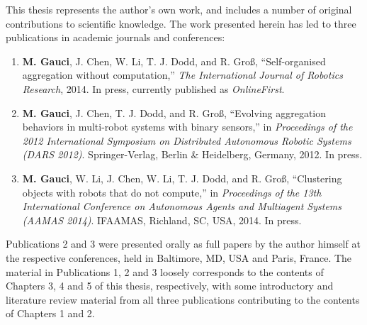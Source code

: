 This thesis represents the author's own work, and includes a number of original contributions to scientific knowledge. The work presented herein has led to three publications in academic journals and conferences:

\begin{enumerate}
%
\item \textbf{M. Gauci}, J. Chen, W. Li, T. J. Dodd, and R. Gro{\ss}, ``Self-organised aggregation without computation,'' \textit{The International Journal of Robotics Research}, 2014. In press, currently published as \textit{OnlineFirst}.
%
\item \textbf{M. Gauci}, J. Chen, T. J. Dodd, and R. Gro{\ss}, ``Evolving aggregation behaviors in
multi-robot systems with binary sensors,'' in \textit{Proceedings of the 2012 International Symposium on
Distributed Autonomous Robotic Systems (DARS 2012)}. Springer-Verlag, Berlin \& Heidelberg,
Germany, 2012. In press.
%
\item \textbf{M. Gauci}, W. Li, J. Chen, W. Li, T. J. Dodd, and R. Gro{\ss}, ``Clustering objects with robots that do not compute,'' in \textit{Proceedings of the 13th International Conference on Autonomous Agents and Multiagent Systems (AAMAS 2014)}. IFAAMAS, Richland, SC, USA, 2014. In press.
%
\end{enumerate}

Publications 2 and 3 were presented orally as full papers by the author himself at the respective conferences, held in Baltimore, MD, USA and Paris, France. The material in Publications 1, 2 and 3 loosely corresponds to the contents of Chapters 3, 4 and 5 of this thesis, respectively, with some introductory and literature review material from all three publications contributing to the contents of Chapters 1 and 2.

